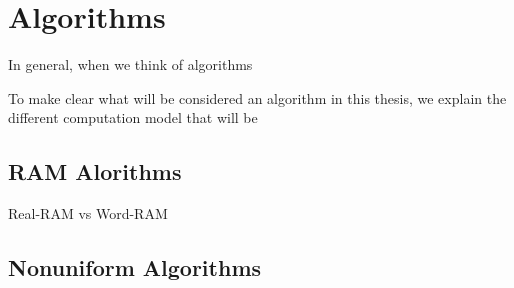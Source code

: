 \section{Algorithms}

In general, when we think of algorithms 



To make clear what will be considered an algorithm in this thesis, we explain
the different computation model that will be

\subsection{RAM Alorithms}

Real-RAM vs Word-RAM

\subsection{Nonuniform Algorithms}






